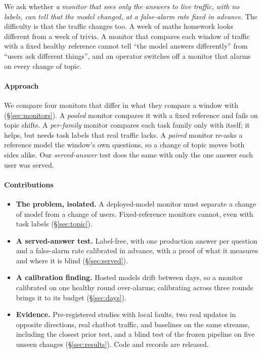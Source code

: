 \documentclass{article}
\begin{document}
We ask whether \emph{a monitor that sees only the answers to live traffic, with no
labels, can tell that the model changed, at a false-alarm rate fixed in advance}.
The difficulty is that the traffic changes too. A week of maths homework looks
different from a week of trivia. A monitor that compares each window of traffic
with a fixed healthy reference cannot tell ``the model answers differently'' from
``users ask different things'', and an operator switches off a monitor that alarms
on every change of topic.

\paragraph{Approach} We compare four monitors that differ in what they compare a
window with (\S\ref{sec:monitors}). A \emph{pooled} monitor compares it with a
fixed reference and fails on topic shifts. A \emph{per-family} monitor compares
each task family only with itself; it helps, but needs task labels that real
traffic lacks. A \emph{paired} monitor re-asks a reference model the window's own
questions, so a change of topic moves both sides alike. Our \emph{served-answer}
test does the same with only the one answer each user was served.

\paragraph{Contributions}
\begin{itemize}[leftmargin=*,itemsep=1pt]
  \item \textbf{The problem, isolated.} A deployed-model monitor must separate a
  change of model from a change of users. Fixed-reference monitors cannot, even
  with task labels (\S\ref{sec:topic}).
  \item \textbf{A served-answer test.} Label-free, with one production answer per
  question and a false-alarm rate calibrated in advance, with a proof of what it
  measures and where it is blind (\S\ref{sec:served}).
  \item \textbf{A calibration finding.} Hosted models drift between days, so a
  monitor calibrated on one healthy round over-alarms; calibrating across three
  rounds brings it to its budget (\S\ref{sec:days}).
  \item \textbf{Evidence.} Pre-registered studies with local faults, two real
  updates in opposite directions, real chatbot traffic, and baselines on the same
  streams, including the closest prior test, and a blind test of the frozen
  pipeline on five unseen changes (\S\ref{sec:results}). Code and records are
  released.
\end{itemize}
\end{document}
